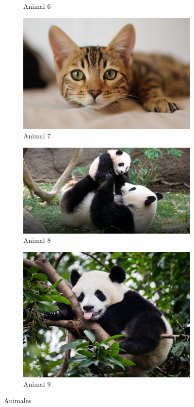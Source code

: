 \documentclass[12pt]{article}
\begin{document}
\begin{figure}
\begin{subfigure}{0.49\linewidth}
    \caption{Animal 6}
    \label{fig:animal6}
    \end{subfigure}
    \begin{subfigure}{0.49\linewidth}
    \centering
    \includegraphics[width=0.7\linewidth]{animals/animal7.jpg}
    \caption{Animal 7}
    \label{fig:animal7}
    \end{subfigure}
    \begin{subfigure}{0.49\linewidth}
    \centering
    \includegraphics[width=0.7\linewidth]{animals/animal8.jpg}
    \caption{Animal 8}
    \label{fig:animal8}
    \end{subfigure}
    \begin{subfigure}{0.49\linewidth}
    \centering
    \includegraphics[width=0.7\linewidth]{animals/animal9.jpg}
    \caption{Animal 9}
    \label{fig:animal9}
    \end{subfigure}
    \caption{Animales}
\end{figure}
\end{document}
